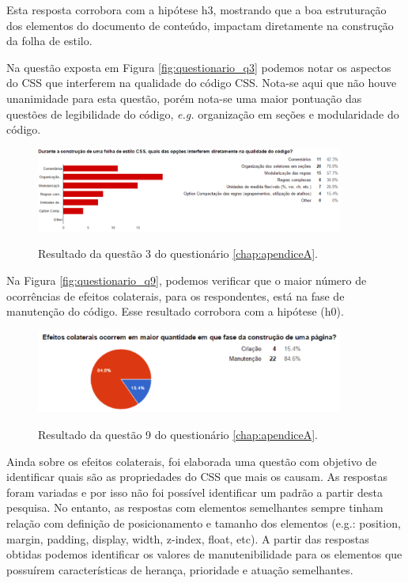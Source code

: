 Esta resposta corrobora com a hipótese h3, mostrando que a boa estruturação dos elementos do documento de conteúdo, impactam diretamente na construção da folha de estilo.

Na questão exposta em Figura \autoref{fig:questionario_q3} podemos notar os aspectos do CSS que interferem na qualidade do código CSS. Nota-se aqui que não houve unanimidade para esta questão, porém nota-se uma maior pontuação das questões de legibilidade do código, \textit{e.g.} organização em seções e modularidade do código.

\begin{figure}[!htb]
	\centering
	\caption{Resultado da questão 3 do questionário \autoref{chap:apendiceA}.}
	\includegraphics[width=0.9\textwidth]{./04-figuras/questionario_q3}
	\label{fig:questionario_q3}
\end{figure}

Na Figura \autoref{fig:questionario_q9}, podemos verificar que o maior número de ocorrências de efeitos colaterais, para os respondentes, está na fase de manutenção do código. Esse resultado corrobora com a hipótese (h0).

\begin{figure}[!htb]
	\centering
	\caption{Resultado da questão 9 do questionário \autoref{chap:apendiceA}.}
	\includegraphics[width=0.9\textwidth]{./04-figuras/questionario_q9}
	\label{fig:questionario_q9}
\end{figure}

Ainda sobre os efeitos colaterais, foi elaborada uma questão com objetivo de identificar quais são as propriedades do CSS que mais os causam. As respostas foram variadas e por isso não foi possível identificar um padrão a partir desta pesquisa. No entanto, as respostas com elementos semelhantes sempre tinham relação com definição de posicionamento e tamanho dos elementos (e.g.: position, margin, padding, display, width, z-index, float, etc). A partir das respostas obtidas podemos identificar os valores de manutenibilidade para os elementos que possuírem características de herança, prioridade e atuação semelhantes.

